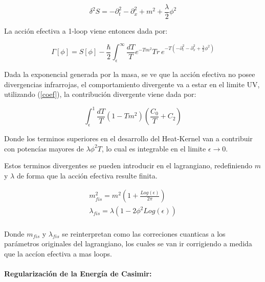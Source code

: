 \begin{equation}
\delta ^2 S = 
- \partial _t ^2 
- \partial _x ^2 
+ m ^2 
+ \frac{\lambda}{2}\phi ^2 
\end{equation}

La acción efectiva a 1-loop viene entonces dada por:

\begin{equation}
\Gamma [ \phi ] = 
S[ \phi ] - 
\frac{\hbar }{2}
\int _ { \epsilon } ^{\infty} \frac{ dT}{T} 
e ^{- T m ^2 }
Tr \  e ^{- T ( - \partial _t ^2 - \partial _x ^2 + \frac{\lambda}{2} \phi ^2 ) }
\end{equation}

Dada la exponencial generada por la masa, se ve que  la acción efectiva no posee divergencias infrarrojas, el comportamiento divergente va a estar en el limite UV, utilizando (\ref{coef}), la contribución divergente viene dada por:


\begin{equation}
\int _ { \epsilon } ^{1}  
\frac{ dT}{T} 
\left(
		1 - T m^2
		\right)
\left(
		\frac{C _0}{T} + C _2 
		\right)
\end{equation}


Donde los terminos superiores en el  desarrollo del Heat-Kernel van a contribuir con potencías mayores de $ \lambda \phi ^2 T $, lo cual es integrable en el limite $\epsilon \rightarrow 0 $.


Estos terminos divergentes se pueden introducir en el lagrangiano, redefiniendo $m$ y $\lambda$ de forma que la acción efectiva resulte finita.

\begin{equation}
\begin{array}{c}
m ^2 _{fis} = m ^2 \left(
							1 + \frac{Log (\epsilon)}{2 \pi} 
							\right) \\[10pt]
							
\lambda _{fis} = \lambda \left(
								 1 - 2 \phi ^2 Log( \epsilon )
								 \right) \\[10pt]


\end{array}
\end{equation}

Donde $m _{fis}$ y $ \lambda _{fis} $ se reinterpretan como las correciones cuanticas a los parámetros originales del lagrangiano, los cuales se van ir corrigiendo a medida que la accíon efectiva a mas loops. \\ \\

\textbf{Regularización de la Energía de Casimir:}\\

